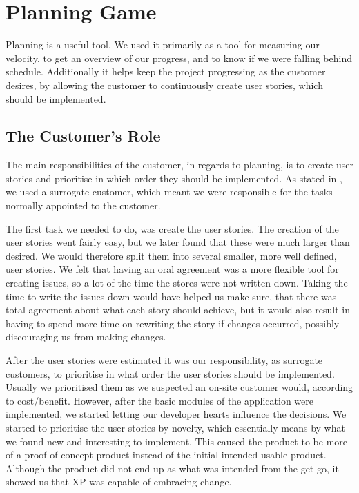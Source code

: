 \section{Planning Game}
Planning is a useful tool.
We used it primarily as a tool for measuring our velocity, to get an overview of our progress, and to know if we were falling behind schedule.
Additionally it helps keep the project progressing as the customer desires, by allowing the customer to continuously create user stories, which should be implemented.

\subsection{The Customer's Role}
The main responsibilities of the customer, in regards to planning, is to create user stories and prioritise in which order they should be implemented.
As stated in , we used a surrogate customer, which meant we were responsible for the tasks normally appointed to the customer.

The first task we needed to do, was create the user stories.
The creation of the user stories went fairly easy, but we later found that these were much larger than desired.
We would therefore split them into several smaller, more well defined, user stories.
We felt that having an oral agreement was a more flexible tool for creating issues, so a lot of the time the stores were not written down.
Taking the time to write the issues down would have helped us make sure, that there was total agreement about what each story should achieve, but it would also result in having to spend more time on rewriting the story if changes occurred, possibly discouraging us from making changes.

After the user stories were estimated it was our responsibility, as surrogate customers, to prioritise in what order the user stories should be implemented.
Usually we prioritised them as we suspected an on-site customer would, according to cost/benefit.
However, after the basic modules of the application were implemented, we started letting our developer hearts influence the decisions.
We started to prioritise the user stories by novelty, which essentially means by what we found new and interesting to implement.
This caused the product to be more of a proof-of-concept product instead of the initial intended usable product.
Although the product did not end up as what was intended from the get go, it showed us that XP was capable of embracing change.


